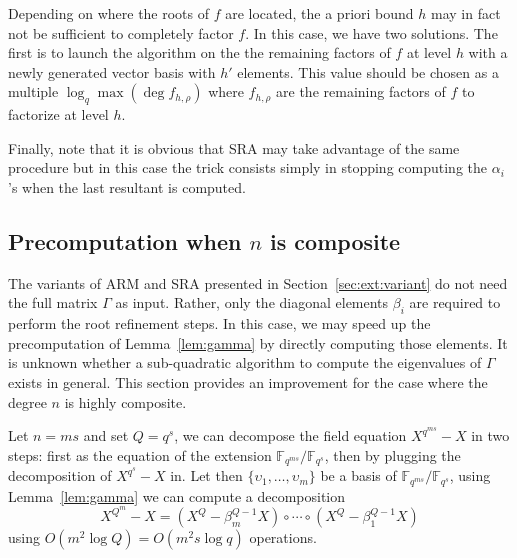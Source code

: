 \documentclass{sig-alternate}
\newcommand{\ff}[1]{\mathbb{F}_{#1}}
\newcommand{\qq}{q}
\newcommand{\QQ}{Q}
\newcommand{\nn}{n}
\newcounter{algo}
\begin{document}
Depending on where the roots of $f$ are located, the a priori bound $h$ may in fact not be sufficient to completely factor $f$. In this case, we have two solutions.
The first is to launch the algorithm on the the remaining factors of $f$ at level $h$ with a newly generated vector basis with $h'$ elements. This value should be chosen 
 as a multiple $\log_{\qq} \max(\deg f_{h,\rho})$ where $f_{h,\rho}$ are the remaining factors of $f$ to factorize at level $h$.
 
Finally, note that it is obvious that SRA may take advantage of the same procedure but in this case the trick consists simply in stopping computing the $\alpha_i$'s when the last resultant is computed.
 



\subsection{Precomputation when $n$ is composite}

The variants of ARM and SRA presented in Section~\ref{sec:ext:variant}
do not need the full matrix $\Gamma$ as input. Rather, only the
diagonal elements $\beta_i$ are required to perform the root
refinement steps. In this case, we may speed up the precomputation of
Lemma~\ref{lem:gamma} by directly computing those elements. It is
unknown whether a sub-quadratic algorithm to compute the eigenvalues
of $\Gamma$ exists in general. This section provides an improvement
for the case where the degree $\nn$ is highly composite.

Let $\nn=ms$ and set $\QQ=\qq^s$, we can decompose the field equation
$X^{\qq^{ms}}-X$ in two steps: first as the equation of the extension
$\ff{\qq^{ms}}/\ff{\qq^s}$, then by plugging the decomposition of
$X^{\qq^s}-X$ in. Let then $\{\upsilon_1,\dots,\upsilon_m\}$ be a
basis of $\ff{\qq^{ms}}/\ff{\qq^s}$, using Lemma~\ref{lem:gamma} we
can compute a decomposition
\begin{equation}
  \label{eq:decompQm}
  X^{\QQ^m}-X = (X^\QQ - \beta_m^{\QQ-1}X)\circ\cdots\circ(X^\QQ - \beta_1^{\QQ-1}X)
\end{equation}
using $O(m^2\log\QQ) = O(m^2s\log\qq)$ operations.
\end{document}
